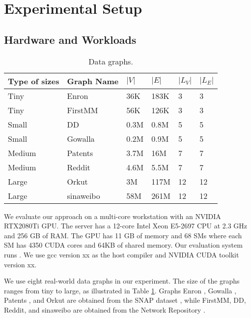 \section{Experimental Setup}

\subsection{Hardware and Workloads}

\begin{table} [t!]
\centering
  \caption{Data graphs.}
  \label{tab:datagraph}
  \small
  \begin{tabular}{llllll}
  \toprule
    \textbf{Type of sizes}&\textbf{Graph Name} &$|V|$&$|E|$&$|L_V|$&$|L_E|$\\
    \midrule
    Tiny	&Enron		&36K	&183K	&3	&3 \\
    Tiny	&FirstMM 	&56K	&126K	&3	&3 \\
    Small	&DD			&0.3M	&0.8M	&5	&5\\
    Small	&Gowalla	&0.2M	&0.9M	&5	&5\\
    Medium	&Patents	&3.7M	&16M	&7	&7\\
    Medium	&Reddit		&4.6M	&5.5M	&7	&7\\
    Large	&Orkut		&3M		&117M	&12	&12\\
	Large	&sinaweibo	&58M	&261M	&12	&12\\

    \bottomrule
  \end{tabular}
\end{table}
 We evaluate our approach on a multi-core workstation with an NVIDIA RTX2080Ti GPU. The server has a
12-core Intel Xeon E5-2697 CPU at 2.3 GHz and 256 GB of RAM. The GPU has 11 GB of memory and 68 SMs where each SM has 4350 CUDA cores and
64KB of shared memory. Our evaluation system runs . We use gcc version xx as the host compiler and
NVIDIA CUDA toolkit version xx. 

 We use eight real-world data graphs in our experiment. The size of the graphs ranges from tiny to large, as
illustrated in Table \ref{tab:datagraph}. Graphs Enron \cite{leskovec2009community}, Gowalla \cite{cho2011friendship}, Patents
\cite{leskovec2005graphs}, and Orkut \cite{yang2015defining} are obtained from the SNAP dataset \cite{snapnets}, while FirstMM, DD, Reddit,
and sinaweibo are obtained from the Network Repository \cite{ryan2015network,nr-sigkdd16}.

